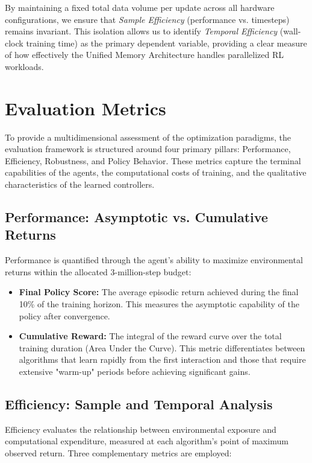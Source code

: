 By maintaining a fixed total data volume per update across all hardware configurations, we ensure that \textit{Sample Efficiency} (performance vs. timesteps) remains invariant. This isolation allows us to identify \textit{Temporal Efficiency} (wall-clock training time) as the primary dependent variable, providing a clear measure of how effectively the Unified Memory Architecture handles parallelized RL workloads.
\section{Evaluation Metrics}

To provide a multidimensional assessment of the optimization paradigms, the evaluation framework is structured around four primary pillars: Performance, Efficiency, Robustness, and Policy Behavior. These metrics capture the terminal capabilities of the agents, the computational costs of training, and the qualitative characteristics of the learned controllers.

\subsection{Performance: Asymptotic vs. Cumulative Returns}

Performance is quantified through the agent’s ability to maximize environmental returns within the allocated 3-million-step budget:

\begin{itemize}
    \item \textbf{Final Policy Score:} The average episodic return achieved during the final 10\% of the training horizon. This measures the asymptotic capability of the policy after convergence.
    
    \item \textbf{Cumulative Reward:} The integral of the reward curve over the total training duration (Area Under the Curve). This metric differentiates between algorithms that learn rapidly from the first interaction and those that require extensive "warm-up" periods before achieving significant gains.
\end{itemize}

\subsection{Efficiency: Sample and Temporal Analysis}

Efficiency evaluates the relationship between environmental exposure and computational expenditure, measured at each algorithm's point of maximum observed return. Three complementary metrics are employed:

